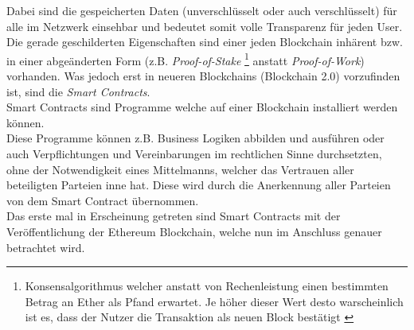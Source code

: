 Dabei sind die gespeicherten Daten (unverschlüsselt oder auch verschlüsselt) für alle im Netzwerk einsehbar und bedeutet somit volle Transparenz für jeden User. \\ 
Die gerade geschilderten Eigenschaften sind einer jeden Blockchain inhärent bzw. in einer abgeänderten Form (z.B. \textit{Proof-of-Stake} \footnote{Konsensalgorithmus welcher anstatt von Rechenleistung einen bestimmten Betrag an Ether als Pfand erwartet. Je höher dieser Wert desto warscheinlich ist es, dass der Nutzer die Transaktion als neuen Block bestätigt \cite{PoS:BTCE,PoS:Wiki}} anstatt \textit{Proof-of-Work}) vorhanden. 
Was jedoch erst in neueren Blockchains (Blockchain 2.0) vorzufinden ist, sind die \textit{Smart Contracts}.\\
Smart Contracts sind Programme welche auf einer Blockchain installiert werden können.\\
Diese Programme können z.B. Business Logiken abbilden und ausführen oder auch Verpflichtungen und Vereinbarungen im rechtlichen Sinne durchsetzten, ohne der Notwendigkeit eines Mittelmanns, welcher das Vertrauen aller beteiligten Parteien inne hat. Diese  wird durch die Anerkennung aller Parteien von dem Smart Contract übernommen. \\
Das erste mal in Erscheinung getreten sind Smart Contracts mit der Veröffentlichung der Ethereum Blockchain, welche nun im Anschluss genauer betrachtet wird.

